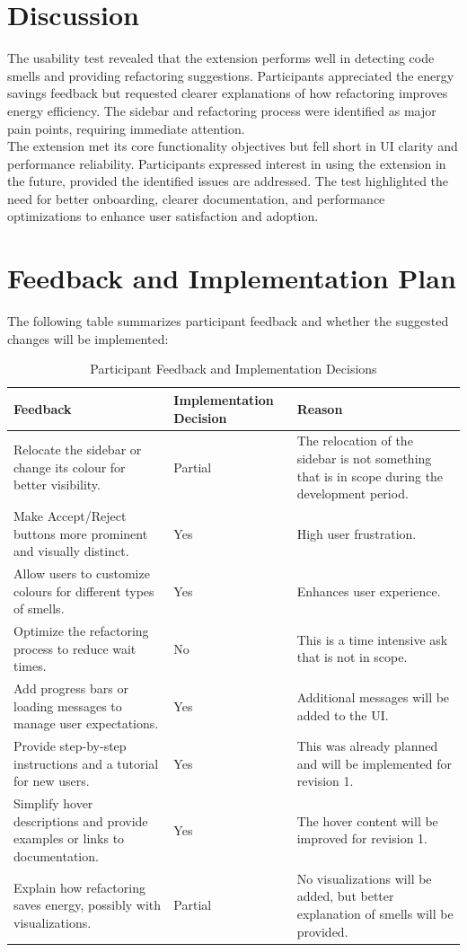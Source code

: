 \documentclass[12pt, titlepage]{article}
\begin{document}
\section*{Discussion}
The usability test revealed that the extension performs well in detecting code smells and providing refactoring suggestions. Participants appreciated the energy savings feedback but requested clearer explanations of how refactoring improves energy efficiency. The sidebar and refactoring process were identified as major pain points, requiring immediate attention.\\

The extension met its core functionality objectives but fell short in UI clarity and performance reliability. Participants expressed interest in using the extension in the future, provided the identified issues are addressed. The test highlighted the need for better onboarding, clearer documentation, and performance optimizations to enhance user satisfaction and adoption.

\section*{Feedback and Implementation Plan}
The following table summarizes participant feedback and whether the suggested changes will be implemented:

\begin{table}[H]
\centering
\begin{tabular}{>{\raggedright\arraybackslash}p{6cm}p{3.2cm}>{\raggedright\arraybackslash}p{5cm}}
\toprule \textbf{Feedback} & \textbf{Implementation Decision} & \textbf{Reason} \\
\midrule
Relocate the sidebar or change its colour for better visibility. & Partial & The relocation of the sidebar is not something that is in scope during the development period. \\
Make Accept/Reject buttons more prominent and visually distinct. & Yes & High user frustration. \\
Allow users to customize colours for different types of smells. & Yes & Enhances user experience. \\
Optimize the refactoring process to reduce wait times. & No & This is a time intensive ask that is not in scope. \\
Add progress bars or loading messages to manage user expectations. & Yes & Additional messages will be added to the UI.\\
Provide step-by-step instructions and a tutorial for new users. & Yes & This was already planned and will be implemented for revision 1. \\
Simplify hover descriptions and provide examples or links to documentation. & Yes & The hover content will be improved for revision 1. \\
Explain how refactoring saves energy, possibly with visualizations. & Partial & No visualizations will be added, but better explanation of smells will be provided. \\
\bottomrule
\end{tabular}
\caption{Participant Feedback and Implementation Decisions}
\end{table}
\end{document}
